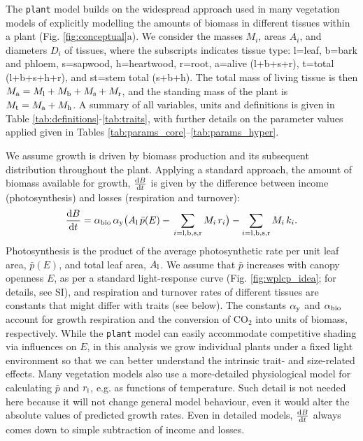 \documentclass[9pt,twocolumn,twoside]{pnas-new}
\newcommand{\plant}{\texttt{plant}}
\begin{document}
The {\plant} model builds on the widespread approach used in many vegetation models of explicitly modelling the amounts of biomass in different tissues within a plant \citep[e.g.][]{Givnish-1988, Makela-1997, Moorcroft-2001, Sitch-2008, Falster-2011, King-2011, DeKauwe-2014} (Fig. \ref{fig:conceptual}a). We consider the masses $M_i$, areas $A_i$, and diameters $D_i$ of tissues, where the subscripts indicates tissue type: l=leaf, b=bark and phloem, s=sapwood, h=heartwood, r=root, a=alive (l+b+s+r), t=total (l+b+s+h+r), and st=stem total (s+b+h). The total mass of living tissue is then $M_{\rm a}=M_{\rm l}+M_{\rm b}+M_{\rm s}+M_{\rm r}$, and the standing mass of the plant is $M_{\rm t}=M_{\rm a}+M_{\rm h}$. A summary of all variables, units and definitions is given in Table \ref{tab:definitions}-\ref{tab:traits}, with further details on the parameter values applied given in Tables \ref{tab:params_core}--\ref{tab:params_hyper}.

We assume growth is driven by biomass production and its subsequent distribution throughout the plant. Applying a standard approach, the amount of biomass available for growth, $\frac{{\rm d}B}{{\rm d}t}$ is given by the difference between income (photosynthesis) and losses (respiration and turnover)\citep{Makela-1997, Thornley-2000}:
\begin{equation}\label{eq:dbdt}
\frac{{\rm d}B}{{\rm d}t}
= \alpha_{\rm bio} \,
\alpha_{\rm y}
\big( A_{\rm l} \, \bar{p}(E) -
\, \sum_{i = {\rm l}, {\rm b}, {\rm s}, {\rm r}}{M_i \, r_i}\big)
- \sum_{i = {\rm l}, {\rm b}, {\rm s},  {\rm r}}{M_i \, k_i}.
\end{equation}
Photosynthesis is the product of the average photosynthetic rate per unit leaf area, $\bar{p}(E)$, and total leaf area, $A_{\rm l}$. We assume that $\bar{p}$ increases with canopy openness $E$, as per a standard light-response curve (Fig. \ref{fig:wplcp_idea}; for details, see SI), and respiration and turnover rates of different tissues are constants that might differ with traits (see below). The constants $\alpha_{\rm y}$ and $\alpha_{\rm bio}$ account for growth respiration and the conversion of CO$_2$ into units of biomass, respectively. While the {\plant} model can easily accommodate competitive shading via influences on $E$, in this analysis we grow individual plants under a fixed light environment so that we can better understand the intrinsic trait- and size-related effects. Many vegetation models also use a more-detailed physiological model for calculating $\bar{p}$ and $r_{\rm i}$, e.g. as functions of temperature. Such detail is not needed here because it will not change general model behaviour, even it would alter the absolute values of predicted growth rates. Even in detailed models, $\frac{{\rm d}B}{{\rm d}t}$ always comes down to simple subtraction of income and losses.
\end{document}
